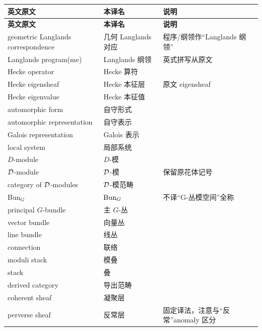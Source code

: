 \medskip
\noindent
\begin{longtable}{@{}p{}p{}p{}@{}}
\toprule
\textbf{英文原文} & \textbf{本译名} & \textbf{说明} \\
\midrule
\endfirsthead
\toprule
\textbf{英文原文} & \textbf{本译名} & \textbf{说明} \\
\midrule
\endhead
\bottomrule
\endfoot
geometric Langlands correspondence & 几何 Langlands 对应 & 程序/纲领作“Langlands 纲领” \\
Langlands program(me)       & Langlands 纲领       & 英式拼写从原文 \\
Hecke operator              & Hecke 算符          & \\
Hecke eigensheaf            & Hecke 本征层        & 原文 eigensheaf \\
Hecke eigenvalue            & Hecke 本征值        & \\
automorphic form            & 自守形式            & \\
automorphic representation  & 自守表示            & \\
Galois representation        & Galois 表示         & \\
local system                & 局部系统              & \\
$D$-module                   & $D$-模             & \\
$\mathcal{D}$-module                 & $\mathcal{D}$-模           & 保留原花体记号 \\
category of $\mathcal{D}$-modules   & $\mathcal{D}$-模范畴       & \\
Bun$_G$                     & $\operatorname{Bun}_G$            & 不译“G-丛模空间”全称 \\
principal $G$-bundle        & 主 $G$-丛           & \\
vector bundle               & 向量丛              & \\
line bundle                 & 线丛                & \\
connection                  & 联络                & \\
moduli stack                & 模叠                & \\
stack                       & 叠                  & \\
derived category            & 导出范畴            & \\
coherent sheaf              & 凝聚层              & \\
perverse sheaf              & 反常层              & 固定译法，注意与“反常”anomaly 区分 \\

\end{longtable}
